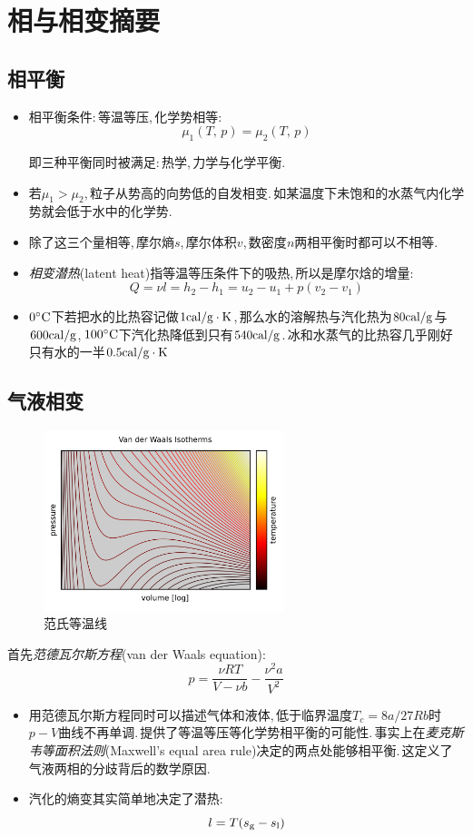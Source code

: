 \chapter{相与相变摘要}


\section{相平衡}

\begin{itemize}
	\item 相平衡条件:\,等温等压,\,化学势相等:\,
	\[\mu_1(T,\,p)=\mu_2(T,\,p)\]

	即三种平衡同时被满足:\,热学,\,力学与化学平衡.

	\item 若$\mu_1>\mu_2$,\,粒子从势高的向势低的自发相变.\,如某温度下未饱和的水蒸气内化学势就会低于水中的化学势.

	\item 除了这三个量相等,\,摩尔熵$s$,\,摩尔体积$v$,\,数密度$n$两相平衡时都可以不相等.

	\item \emph{相变潜热}(latent heat)指等温等压条件下的吸热,\,所以是摩尔焓的增量:
	\[Q=\nu l=h_2-h_1=u_2-u_1+p(v_2-v_1)\]

	\item $0^\circ \mathrm{C}$下若把水的比热容记做$1{\rm cal/g\cdot K}$,\,那么水的溶解热与汽化热为$80{\rm cal/g}$与$600{\rm cal/g}$,\,$100^\circ \mathrm{C}$下汽化热降低到只有$540{\rm cal/g}$.\,冰和水蒸气的比热容几乎刚好只有水的一半$0.5{\rm cal/g\cdot K}$
\end{itemize}

\section{气液相变}
\begin{figure}
\centering
\includegraphics[width=7cm]{image/1.png}
\caption{范氏等温线}
\end{figure}
首先\emph{范德瓦尔斯方程}(van der Waals equation):
\[p=\frac{\nu RT}{V-\nu b}-\frac{\nu^2 a}{V^2}\]
\begin{itemize}
	\item 用范德瓦尔斯方程同时可以描述气体和液体,\,低于临界温度$T_c=8a/27Rb$时$p-V$曲线不再单调.\,提供了等温等压等化学势相平衡的可能性.\,事实上在\emph{麦克斯韦等面积法则}(Maxwell's equal area rule)决定的两点处能够相平衡.\,这定义了气液两相的分歧背后的数学原因.
	\item 汽化的熵变其实简单地决定了潜热:
	\[l=T(s_{\rm g}-s_{\rm l})\]
	\end{itemize}

